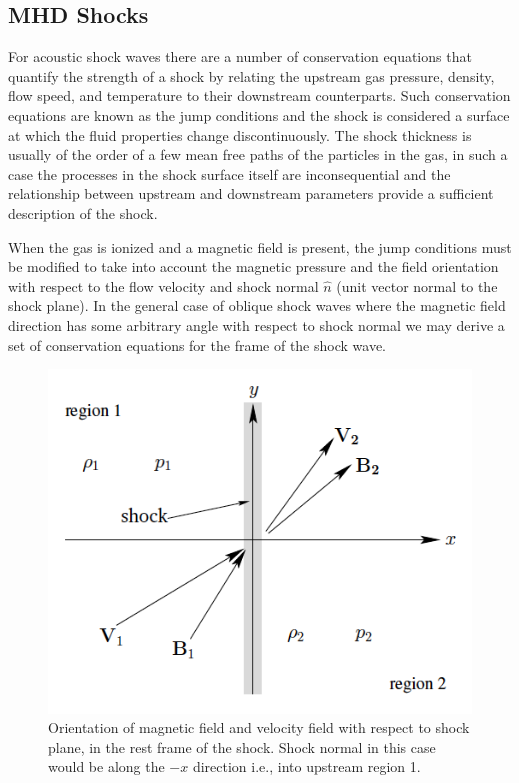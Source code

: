 \subsection{MHD Shocks}\label{sec:mhd_shocks}

For acoustic shock waves there are a number of conservation equations that quantify the strength of a shock by relating the upstream gas pressure, density, flow speed, and temperature to their downstream counterparts. Such conservation equations are known as the jump conditions and the shock is considered a surface at which the fluid properties change discontinuously. The shock thickness is usually of the order of a few mean free paths of the particles in the gas, in such a case the processes in the shock surface itself are inconsequential and the relationship between upstream and downstream parameters provide a sufficient description of the shock. 

When the gas is ionized and a magnetic field is present, the jump conditions must be modified to take into account the magnetic pressure and the field orientation with respect to the flow velocity and shock normal $\hat{n}$ (unit vector normal to the shock plane). In the general case of oblique shock waves where the magnetic field direction has some arbitrary angle with respect to shock normal we may derive a set of conservation equations for the frame of the shock wave. 
\begin{figure}[h!]
\begin{center}
\includegraphics[scale=0.5, angle=0]{images/shock_pic}
\caption[MHD shock framework]{Orientation of magnetic field and velocity field with respect to shock plane, in the rest frame of the shock. Shock normal in this case would be along the $-x$ direction i.e., into upstream region 1. \citep{fitz}}
\label{fig:shock_pic}
\end{center}
\end{figure}

